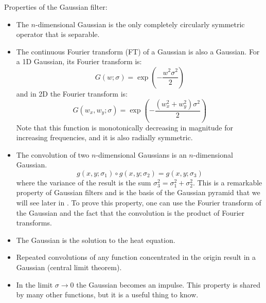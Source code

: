 Properties of the Gaussian filter:
\begin{itemize}
\item The $n$-dimensional Gaussian is the only completely circularly symmetric operator that is separable. 

\item The continuous Fourier transform (FT) of a Gaussian is also a Gaussian. For a 1D Gaussian, its Fourier transform is:
\begin{equation}
G (w; \sigma) = \exp{ \left( -\frac{w^2 \sigma^2} {2} \right) }
\end{equation}
and in 2D the Fourier transform is:
\begin{equation}
G (w_x, w_y; \sigma) = \exp{ \left(- \frac{(w_x^2+w_y^2) \sigma^2} {2} \right) }
\label{eq:FTgauss2d}
\end{equation}
Note that this function is monotonically decreasing in magnitude for increasing frequencies, and it is also radially symmetric. 

\item The convolution of two $n$-dimensional Gaussians is an $n$-dimensional Gaussian.  
\begin{equation}
g (x,y; \sigma_1 ) \circ g (x,y; \sigma_2)  = g (x,y; \sigma_3)
\end{equation}
where the variance of the result is the sum $\sigma_3^2 = \sigma_1^2 + \sigma_2^2$. This is a remarkable property of Gaussian filters and is the basis of the Gaussian pyramid that we will see later in \chap{\ref{chapter:image_pyramids}}. To prove this property, one can use the Fourier transform of the Gaussian and the fact that the convolution is the product of Fourier transforms.

\item The Gaussian is the solution to the heat equation. 

\item Repeated convolutions of any function concentrated in the origin result in a Gaussian (central limit theorem).

\item In the limit $\sigma \rightarrow 0$ the Gaussian becomes an impulse. This property is shared by many other functions, but it is a useful thing to know.
\end{itemize}

